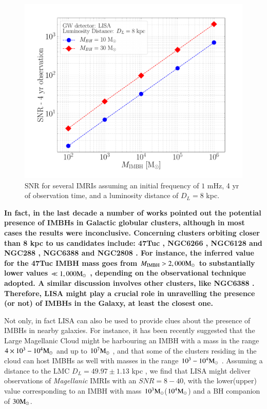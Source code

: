 \documentclass[article]{aa}
\newcommand{\Ms}{{\rm M}_\odot}
\newcommand{\ibh}{{\rm IMBH}}
\begin{document}
\begin{figure}
    \centering
    \includegraphics[width=\columnwidth]{snr_MW}
    \caption{SNR for several IMRIs assuming an initial frequency of $1$ mHz, 4 yr of observation time, and a luminosity distance of $D_L = 8$ kpc.}
    \label{SNRMW}
\end{figure}

{\bf In fact, in the last decade a number of works pointed out the potential presence of IMBHs in Galactic globular clusters, although in most cases the results were inconclusive. Concerning clusters orbiting closer than 8 kpc to us candidates include: 47Tuc \citep{kiziltan17}, NGC6266 \citep{abbate19}, NGC6128 and NGC288 \citep{sollima16}, NGC6388 and NGC2808 \citep{miocchi07,lanzoni07}.
For instance, the inferred value for the 47Tuc IMBH mass goes from $M_\ibh > 2,000\Ms$ \citep{kiziltan17} to substantially lower values $\ll 1,000\Ms$ \citep{abbate19b}, depending on the observational technique adopted. A similar discussion involves other clusters, like NGC6388 \citep{lanzoni13,lutzgendorf13}. Therefore, LISA might play a crucial role in unravelling the presence (or not) of IMBHs in the Galaxy, at least the closest one.

Not only, in fact LISA can also be used to provide clues about the presence of IMBHs in nearby galaxies. For instance, it has been recently suggested that the Large Magellanic Cloud might be harbouring an IMBH with a mass in the range $4\times 10^3-10^4\Ms$ \citep{erkal19} and up to $10^7\Ms$ \citep{boyce17}, and that some of the clusters residing in the cloud can host IMBHs as well with masses in the range $10^3-10^4\Ms$ \citep{gualandris07}. Assuming a distance to the LMC $D_L = 49.97 \pm 1.13$ kpc \citep{pietrzy13}, we find that LISA might deliver observations of {\it Magellanic} IMRIs with an $SNR = 8-40$, with the lower(upper) value corresponding to an IMBH with mass $10^3\Ms$($10^4\Ms$) and a BH companion of $30\Ms$. 
}
\end{document}
